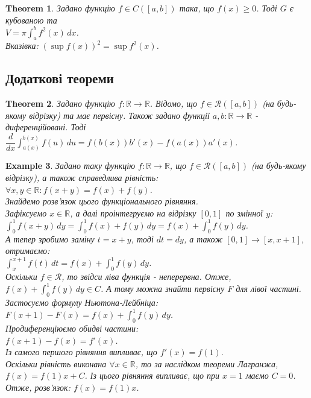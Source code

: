 \documentclass[a4paper, 10pt]{article}
\def\huge{\displaystyle}
\theoremstyle{theoremdd}
\newtheorem{theorem}{Theorem}[subsection]
\theoremstyle{theoremdd}
\theoremstyle{theoremdd}
\theoremstyle{theoremdd}
\theoremstyle{theoremdd}
\newtheorem{example}[theorem]{Example}
\theoremstyle{theoremdd}
\theoremstyle{theoremdd}
\theoremstyle{theoremdd}
\theoremstyle{theoremdd}
\begin{document}
\begin{theorem}
Задано функцію $f \in C([a,b])$ така, що $f(x) \geq 0$. Тоді $G$ є кубованою та \\ $V = \pi \huge\int_a^b f^2(x)\,dx$.\\
\textit{Вказівка: $\huge (\sup f(x))^2 = \sup f^2 (x)$.}
\end{theorem}
\newpage

\iffalse
\subsection{Додаткові теореми}
\begin{theorem}
Задано функцію $f: \mathbb{R} \to \mathbb{R}$. Відомо, що $f \in \mathcal{R}([a,b])$ (на будь-якому відрізку) та має первісну. Також задано функції $a,b: \mathbb{R} \to \mathbb{R}$ - диференційовані. Тоді\\
$\dfrac{d}{dx} \huge\int_{a(x)}^{b(x)}f(u)\,du = f(b(x))b'(x) - f(a(x))a'(x)$.
\end{theorem}

\begin{example}
Задано таку функцію $f: \mathbb{R} \to \mathbb{R}$, що $f \in \mathcal{R}([a,b])$ (на будь-якому відрізку), а також справедлива рівність:\\
$\forall x,y \in \mathbb{R}: f(x+y) = f(x) + f(y)$.\\
Знайдемо розв'язок цього функціонального рівняння.\\
Зафіксуємо $x \in \mathbb{R}$, а далі проінтегруємо на відрізку $[0,1]$ по змінної $y$:\\
$\huge\int_0^1 f(x+y)\,dy = \int_0^1 f(x)+f(y)\,dy = f(x) + \int_0^1 f(y)\,dy$.\\
А тепер зробимо заміну $t = x+y$, тоді $dt = dy$, а також $[0,1] \to [x,x+1]$, отримаємо:\\
$\huge\int_x^{x+1} f(t)\,dt = f(x) + \int_0^1 f(y)\,dy$.\\
Оскільки $f \in \mathcal{R}$, то звідси ліва функція - неперервна. Отже, $\huge f(x) + \int_0^1 f(y)\,dy \in C$. А тому можна знайти первісну $F$ для лівої частині. Застосуємо формулу Ньютона-Лейбніца:\\
$F(x+1) - F(x) = f(x) + \huge\int_0^1 f(y)\,dy$.\\
Продиференціюємо обидві частини:\\
$f(x+1) - f(x) = f'(x)$.\\
Із самого першого рівняння випливає, що $f'(x) = f(1)$.\\
Оскільки рівність виконана $\forall x \in \mathbb{R}$, то за наслідком теореми Лагранжа, $f(x) = f(1)x + C$. Із цього рівняння випливає, що при $x = 1$ маємо $C = 0$.\\
Отже, розв'язок: $f(x) = f(1)x$.
\end{example}
\end{document}
